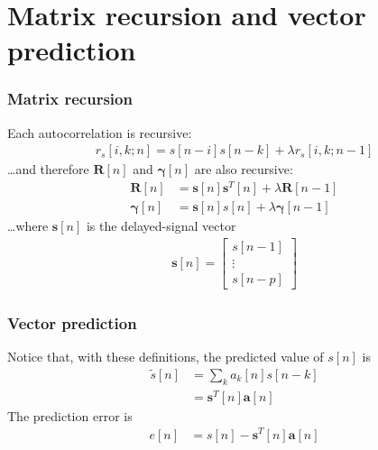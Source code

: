 \documentclass{beamer}
\begin{document}
\section[Matrices]{Matrix recursion and vector prediction}

\begin{frame}
  \frametitle{Matrix recursion}

  Each autocorrelation is recursive:
  \begin{align*}
    r_s[i,k;n] = s[n-i]s[n-k] + \lambda r_s[i,k;n-1]
  \end{align*}
  \ldots and therefore $\mathbf{R}[n]$ and $\boldsymbol{\gamma}[n]$
  are also recursive:
  \begin{align*}
    \mathbf{R}[n]&=\mathbf{s}[n]\mathbf{s}^T[n] + \lambda\mathbf{R}[n-1]\\
    \boldsymbol{\gamma}[n] &= \mathbf{s}[n]s[n] + \lambda\boldsymbol{\gamma}[n-1]
  \end{align*}
  \ldots where $\mathbf{s}[n]$ is the delayed-signal vector
  \begin{align*}
    \mathbf{s}[n] = \left[\begin{array}{c}s[n-1]\\\vdots\\s[n-p]\end{array}\right]
  \end{align*}
\end{frame}

\begin{frame}
  \frametitle{Vector prediction}

  Notice that, with these definitions, the predicted value of $s[n]$ is
  \begin{align*}
    \tilde{s}[n] &= \sum_k a_k[n] s[n-k]\\
    &= \mathbf{s}^T[n]\mathbf{a}[n]
  \end{align*}
  The prediction error is
  \begin{align*}
    e[n] &= s[n]-\mathbf{s}^T[n]\mathbf{a}[n]
  \end{align*}
\end{frame}
  
\end{document}
